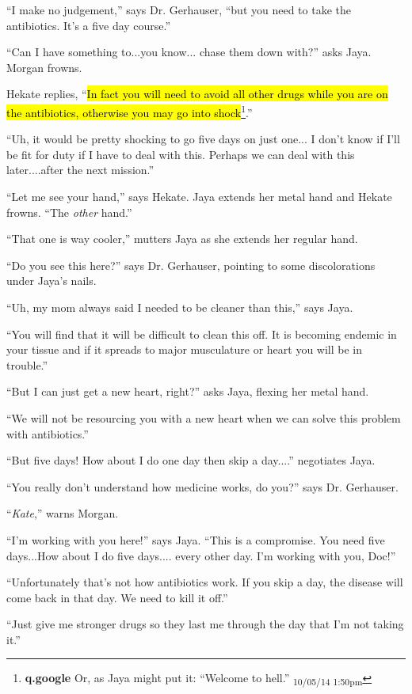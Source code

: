 ``I make no judgement,'' says Dr. Gerhauser, ``but you need to take the antibiotics.  It's a five day course.''

``Can I have something to...you know... chase them down with?'' asks Jaya.  Morgan frowns.

Hekate replies, ``\hl{In fact you will need to avoid all other drugs while you are on the antibiotics, otherwise you may go into shock}\footnote{\textbf{q.google }Or, as Jaya might put it: ``Welcome to hell.'' \textsubscript{10/05/14 1:50pm}}.''

``Uh, it would be pretty shocking to go five days on just one... I don't know if I'll be fit for duty if I have to deal with this.  Perhaps we can deal with this later....after the next mission.''

``Let me see your hand,'' says Hekate.  Jaya extends her metal hand and Hekate frowns.  ``The \textit{other} hand.''

``That one is way cooler,'' mutters Jaya as she extends her regular hand.

``Do you see this here?'' says Dr. Gerhauser, pointing to some discolorations under Jaya's nails.

``Uh, my mom always said I needed to be cleaner than this,'' says Jaya.

``You will find that it will be difficult to clean this off.  It is becoming endemic in your tissue and if it spreads to major musculature or heart you will be in trouble.''

``But I can just get a new heart, right?'' asks Jaya, flexing her metal hand.

``We will not be resourcing you with a new heart when we can solve this problem with antibiotics.''

``But five days!  How about I do one day then skip a day....'' negotiates Jaya.

``You really don't understand how medicine works, do you?'' says Dr. Gerhauser.

``\textit{Kate},'' warns Morgan.

``I'm working with you here!'' says Jaya.  ``This is a compromise.  You need five days...How about I do five days.... every other day.  I'm working with you, Doc!''

``Unfortunately that's not how antibiotics work.  If you skip a day, the disease will come back in that day.  We need to kill it off.''

``Just give me stronger drugs so they last me through the day that I'm not taking it.''

